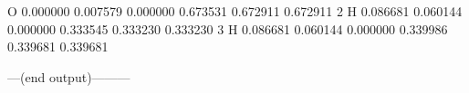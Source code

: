 \documentclass[letterpaper,10pt,english]{sphinxmanual}
\begin{document}
\begin{fulllineitems}
\begin{description}
\begin{quote}
\begin{description}
\end{description}
\end{quote}

 O     0.000000   \sphinxhyphen{}0.007579    0.000000   \sphinxhyphen{}0.673531   \sphinxhyphen{}0.672911   \sphinxhyphen{}0.672911
2 H     0.086681    0.060144    0.000000    0.333545    0.333230    0.333230
3 H    \sphinxhyphen{}0.086681    0.060144    0.000000    0.339986    0.339681    0.339681

\end{description}

\sphinxAtStartPar
—\sphinxhyphen{}(end output)———\sphinxhyphen{}

\end{fulllineitems}

\end{document}
